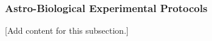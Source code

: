 
\subsubsection{Astro-Biological Experimental Protocols}
\label{subsubsec:design_9_2_astrobiological_protocols}

[Add content for this subsection.]
